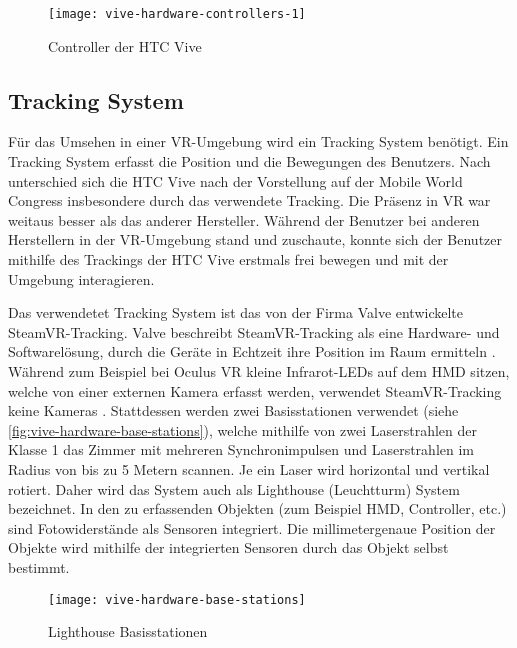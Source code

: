 \begin{figure}[!htbp]
	\centering
	\texttt{[image: vive-hardware-controllers-1]}
	\caption[Controller der HTC Vive]{Controller der HTC Vive \cite{ViveControllers}}
	\label{fig:vive-hardware-controllers-1}
\end{figure}

\subsection{Tracking System}
Für das Umsehen in einer \ac{VR}-Umgebung wird ein Tracking System benötigt. Ein Tracking System erfasst die Position und die Bewegungen des Benutzers. Nach \citeauthor{Sauter.2015} unterschied sich die HTC Vive nach der Vorstellung auf der Mobile World Congress insbesondere durch das verwendete Tracking. Die Präsenz in \ac{VR} war weitaus besser als das anderer Hersteller. Während der Benutzer bei anderen Herstellern in der \ac{VR}-Umgebung stand und zuschaute, konnte sich der Benutzer mithilfe des Trackings der HTC Vive erstmals frei bewegen und mit der Umgebung interagieren. \cite{Sauter.2015} 

Das verwendetet Tracking System ist das von der Firma Valve entwickelte SteamVR-Tracking. Valve beschreibt SteamVR-Tracking als eine Hardware- und Softwarelösung, durch die Geräte in Echtzeit ihre Position im Raum ermitteln \cite{Valve.2020}. Während zum Beispiel bei Oculus VR kleine Infrarot-LEDs auf dem \ac{HMD} sitzen, welche von einer externen Kamera erfasst werden, verwendet SteamVR-Tracking keine Kameras \cite{Sauter.2015}. Stattdessen werden zwei Basisstationen verwendet (siehe \autoref{fig:vive-hardware-base-stations}), welche mithilfe von zwei Laserstrahlen der Klasse 1 \glqq das Zimmer mit mehreren Synchronimpulsen und Laserstrahlen im Radius von bis zu 5 Metern\grqq{} \cite{Valve.2020} scannen. Je ein Laser wird horizontal und vertikal rotiert. Daher wird das System auch als Lighthouse (Leuchtturm) System bezeichnet. In den zu erfassenden Objekten (zum Beispiel \ac{HMD}, Controller, etc.) sind Fotowiderstände als Sensoren integriert. Die millimetergenaue Position der Objekte wird mithilfe der integrierten Sensoren durch das Objekt selbst bestimmt. \cite{Yates.20160512}

\begin{figure}[!htbp]
	\centering
	\texttt{[image: vive-hardware-base-stations]}
	\caption[Lighthouse Basisstationen]{Lighthouse Basisstationen \cite{ViveBaseStation}}
	\label{fig:vive-hardware-base-stations}
\end{figure}

